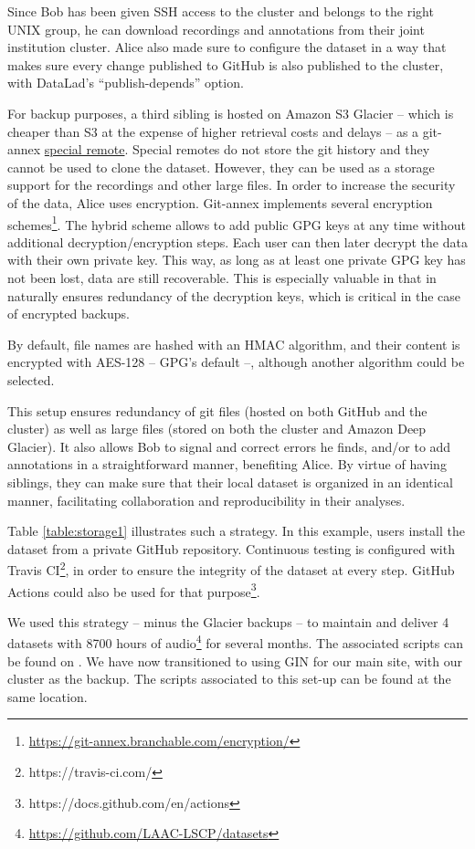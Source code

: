 \documentclass[smallextended]{svjour3}       %
\begin{document}
Since Bob has been given SSH access to the cluster and belongs to the right UNIX group, he can download recordings and annotations from their joint institution cluster. Alice also made sure to configure the dataset in a way that makes sure every change published to GitHub is also published to the cluster, with DataLad's ``publish-depends'' option. 

For backup purposes, a third sibling is hosted on Amazon S3 Glacier -- which is cheaper than S3 at the expense of higher retrieval costs and delays -- as a git-annex \href{https://git-annex.branchable.com/special_remotes/}{special remote}. Special remotes do not store the git history and they cannot be used to clone the dataset. However, they can be used as a storage support for the recordings and other large files. In order to increase the security of the data, Alice uses encryption. Git-annex implements several encryption schemes\footnote{\url{https://git-annex.branchable.com/encryption/}}. The hybrid scheme allows to add public GPG keys at any time without additional decryption/encryption steps. Each user can then later decrypt the data with their own private key. This way, as long as at least one private GPG key has not been lost, data are still recoverable. This is especially valuable in that in naturally ensures redundancy of the decryption keys, which is critical in the case of encrypted backups.

By default, file names are hashed with an HMAC algorithm, and their content is encrypted with AES-128 -- GPG's default --, although another algorithm could be selected.

This setup ensures redundancy of git files (hosted on both GitHub and the cluster) as well as large files (stored on both the cluster and Amazon Deep Glacier). It also allows Bob to signal and correct errors he finds, and/or to add annotations in a straightforward manner, benefiting Alice. By virtue of having siblings, they can make sure that their local dataset is organized in an identical manner, facilitating collaboration and reproducibility in their analyses.

Table \ref{table:storage1} illustrates such a strategy. In this example, users install the dataset from a private GitHub repository. Continuous testing is configured with Travis CI\footnote{https://travis-ci.com/}, in order to ensure the integrity of the dataset at every step. GitHub Actions could also be used for that purpose\footnote{https://docs.github.com/en/actions}.

We used this strategy -- minus the Glacier backups -- to maintain and deliver 4 datasets with 8700 hours of audio\footnote{\url{https://github.com/LAAC-LSCP/datasets}} for several months. The associated scripts can be found on \cite{datalad_procedures}. We have now transitioned to using GIN for our main site, with our cluster as the backup. The scripts associated to this set-up can be found at the same location.
\end{document}
